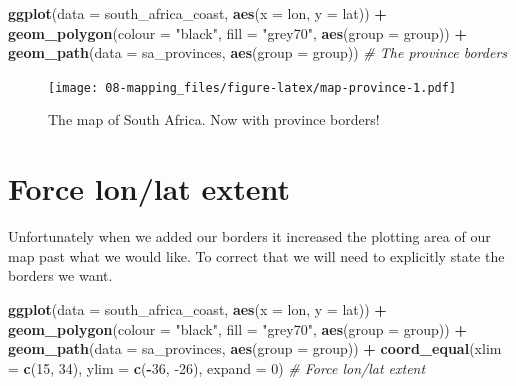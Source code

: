 \documentclass[
]{book}
\newenvironment{Shaded}{\begin{snugshade}}{\end{snugshade}}
\newcommand{\CommentTok}[1]{\textcolor[rgb]{0.56,0.35,0.01}{\textit{#1}}}
\newcommand{\DataTypeTok}[1]{\textcolor[rgb]{0.13,0.29,0.53}{#1}}
\newcommand{\DecValTok}[1]{\textcolor[rgb]{0.00,0.00,0.81}{#1}}
\newcommand{\KeywordTok}[1]{\textcolor[rgb]{0.13,0.29,0.53}{\textbf{#1}}}
\newcommand{\NormalTok}[1]{#1}
\newcommand{\OperatorTok}[1]{\textcolor[rgb]{0.81,0.36,0.00}{\textbf{#1}}}
\newcommand{\StringTok}[1]{\textcolor[rgb]{0.31,0.60,0.02}{#1}}
\begin{document}
\begin{Shaded}
\begin{Highlighting}[]
\KeywordTok{ggplot}\NormalTok{(}\DataTypeTok{data =}\NormalTok{ south\_africa\_coast, }\KeywordTok{aes}\NormalTok{(}\DataTypeTok{x =}\NormalTok{ lon, }\DataTypeTok{y =}\NormalTok{ lat)) }\OperatorTok{+}
\StringTok{  }\KeywordTok{geom\_polygon}\NormalTok{(}\DataTypeTok{colour =} \StringTok{"black"}\NormalTok{, }\DataTypeTok{fill =} \StringTok{"grey70"}\NormalTok{, }\KeywordTok{aes}\NormalTok{(}\DataTypeTok{group =}\NormalTok{ group)) }\OperatorTok{+}
\StringTok{  }\KeywordTok{geom\_path}\NormalTok{(}\DataTypeTok{data =}\NormalTok{ sa\_provinces, }\KeywordTok{aes}\NormalTok{(}\DataTypeTok{group =}\NormalTok{ group)) }\CommentTok{\# The province borders}
\end{Highlighting}
\end{Shaded}

\begin{figure}
\centering
\texttt{[image: 08-mapping\_files/figure-latex/map-province-1.pdf]}
\caption{\label{fig:map-province}The map of South Africa. Now with province borders!}
\end{figure}

\hypertarget{force-lonlat-extent}{%
\section{Force lon/lat extent}\label{force-lonlat-extent}}

Unfortunately when we added our borders it increased the plotting area of our map past what we would like. To correct that we will need to explicitly state the borders we want.

\begin{Shaded}
\begin{Highlighting}[]
\KeywordTok{ggplot}\NormalTok{(}\DataTypeTok{data =}\NormalTok{ south\_africa\_coast, }\KeywordTok{aes}\NormalTok{(}\DataTypeTok{x =}\NormalTok{ lon, }\DataTypeTok{y =}\NormalTok{ lat)) }\OperatorTok{+}
\StringTok{  }\KeywordTok{geom\_polygon}\NormalTok{(}\DataTypeTok{colour =} \StringTok{"black"}\NormalTok{, }\DataTypeTok{fill =} \StringTok{"grey70"}\NormalTok{, }\KeywordTok{aes}\NormalTok{(}\DataTypeTok{group =}\NormalTok{ group)) }\OperatorTok{+}
\StringTok{  }\KeywordTok{geom\_path}\NormalTok{(}\DataTypeTok{data =}\NormalTok{ sa\_provinces, }\KeywordTok{aes}\NormalTok{(}\DataTypeTok{group =}\NormalTok{ group)) }\OperatorTok{+}\StringTok{ }
\StringTok{  }\KeywordTok{coord\_equal}\NormalTok{(}\DataTypeTok{xlim =} \KeywordTok{c}\NormalTok{(}\DecValTok{15}\NormalTok{, }\DecValTok{34}\NormalTok{), }\DataTypeTok{ylim =} \KeywordTok{c}\NormalTok{(}\OperatorTok{{-}}\DecValTok{36}\NormalTok{, }\DecValTok{{-}26}\NormalTok{), }\DataTypeTok{expand =} \DecValTok{0}\NormalTok{) }\CommentTok{\# Force lon/lat extent}
\end{Highlighting}
\end{Shaded}
\end{document}
